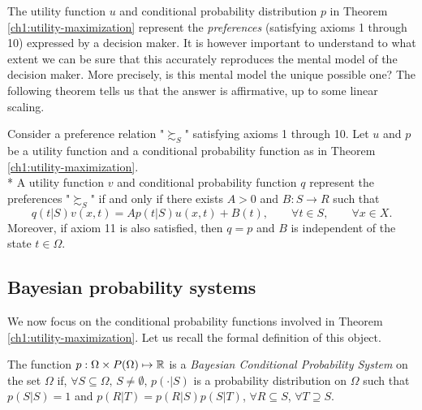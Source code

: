 The utility function $u$ and conditional probability distribution $p$ in Theorem \ref{ch1:utility-maximization} represent the \emph{preferences} (satisfying axioms 1 through 10) expressed by a decision maker. 
It is however important to understand to what extent  we can be sure that this accurately reproduces the mental model of the decision maker. More precisely, is this mental model the unique possible one?  The following theorem tells us that the answer is affirmative, up to some linear scaling.

\begin{theorem}
Consider a preference relation "$\succsim_S$" satisfying axioms 1 through 10.
Let $u$ and $p$ be a utility function and a conditional probability function as in Theorem \ref{ch1:utility-maximization}. \\*
A utility function $v$ and conditional probability function $q$ represent the preferences "$\succsim_S$" if and only if there  exists $A > 0$ and $B : S \rightarrow R$ such that
$$ q(t|S) v(x,t) = Ap(t|S)u(x,t) + B(t), \qquad \forall t \in S, \qquad \forall x \in X. $$
Moreover, if axiom 11 is also satisfied, then $q = p$ and $B$ is independent of the state $t \in \Omega$.
\label{chap1:thm:Equivalent}
\end{theorem}


\subsection{Bayesian probability systems}

We now focus on the conditional probability functions involved in Theorem \ref{ch1:utility-maximization}. Let us recall the formal definition of this object.

\begin{definition}
The function $p: \Omega \times P(\Omega) \mapsto \mathbb{R} $ is a \emph{Bayesian Conditional Probability System} on the set $\Omega$ if, $\forall S \subseteq \Omega, \, S \neq \emptyset$, $p(\cdot|S)$ is a probability distribution on $\Omega$ such that $p(S|S) = 1$ and $p(R|T) = p(R|S) p(S|T)$, $\forall R \subseteq S$, $\forall T \supseteq S.$
\end{definition}

